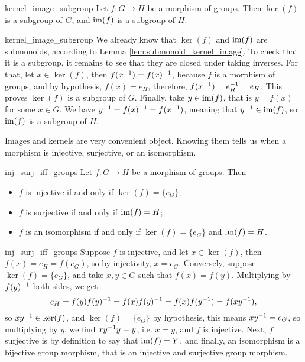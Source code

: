 \begin{clem}{}{kernel_image_subgroup}
    Let \( f : G \to H \) be a morphism of groups. Then \( \ker(f) \) is a subgroup of \( G \), and \( \operatorname{im}(f) \) is a subgroup of \( H \).
\end{clem}
\begin{lemproof}{kernel_image_subgroup}
    We already know that \( \ker(f) \) and \( \operatorname{im}(f) \) are submonoids, according to Lemma \ref{lem:submonoid_kernel_image}. To check that it is a subgroup, it remains to see that they are closed under taking inverses. For that, let \( x \in \ker(f) \), then \( f(x^{-1}) = f(x)^{-1} \), because \( f \) is a morphism of groups, and by hypothesis, \( f(x) = e_H \), therefore, \( f(x^{-1}) = e_H^{-1} = e_H \). This proves \( \ker(f) \) is a subgroup of \( G \). Finally, take \( y \in \operatorname{im}(f) \), that is \( y = f(x) \) for some \( x \in G \). We have \( y^{-1} = f(x)^{-1} = f(x^{-1}) \), meaning that \( y^{-1} \in \operatorname{im}(f) \), so \( \operatorname{im}(f) \) is a subgroup of \( H \).
\end{lemproof}

Images and kernels are very convenient object. Knowing them tells us when a morphism is injective, surjective, or an isomorphism.
\begin{cprop}{}{inj_surj_iff_groups}
    Let \( f : G \to H \) be a morphism of groups. Then
    \begin{itemize}
        \item \( f \) is injective if and only if \( \ker(f) = \{ e_G \} \);
        \item \( f \) is surjective if and only if \( \operatorname{im}(f) = H \);
        \item \( f \) is an isomorphism if and only if \( \ker(f) = \{ e_G \} \) and \( \operatorname{im}(f) = H \).
    \end{itemize}
\end{cprop}
\begin{propproof}{inj_surj_iff_groups}
    Suppose \( f \) is injective, and let \( x \in \ker(f) \), then \( f(x) = e_H = f(e_G )\), so by injectivity, \( x = e_G \). Conversely, suppose \( \ker(f) = \{ e_G \} \), and take \( x, y \in G \) such that \( f(x) = f(y) \). Multiplying by \( f(y)^{-1} \) both sides, we get
    \begin{equation*}
        e_H = f(y) f(y)^{-1} = f(x) f(y)^{-1} = f(x)f(y^{-1}) = f(xy^{-1}),
    \end{equation*}
    so \( x y^{-1} \in \ker(f) \), and \( \ker(f) = \{ e_G \} \) by hypothesis, this means \( x y^{-1} = e_G \), so multiplying by \( y \), we find \( x y^{-1} y = y \), i.e. \( x = y \), and \( f \) is injective. Next, \( f \) surjective is by definition to say that \( \operatorname{im}(f) = Y \), and finally, an isomorphism is a bijective group morphism, that is an injective and surjective group morphism.
\end{propproof}

